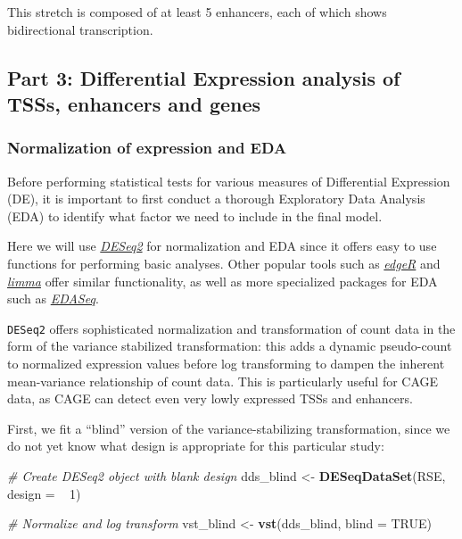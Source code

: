 \documentclass[9pt,a4paper,]{extarticle}
\newenvironment{Shaded}{\begin{snugshade}}{\end{snugshade}}
\newcommand{\KeywordTok}[1]{\textcolor[rgb]{0.13,0.29,0.53}{\textbf{{#1}}}}
\newcommand{\DataTypeTok}[1]{\textcolor[rgb]{0.13,0.29,0.53}{{#1}}}
\newcommand{\DecValTok}[1]{\textcolor[rgb]{0.00,0.00,0.81}{{#1}}}
\newcommand{\StringTok}[1]{\textcolor[rgb]{0.31,0.60,0.02}{{#1}}}
\newcommand{\CommentTok}[1]{\textcolor[rgb]{0.56,0.35,0.01}{\textit{{#1}}}}
\newcommand{\OtherTok}[1]{\textcolor[rgb]{0.56,0.35,0.01}{{#1}}}
\newcommand{\NormalTok}[1]{{#1}}
\begin{document}
This stretch is composed of at least 5 enhancers, each of which shows bidirectional transcription.

\subsection{Part 3: Differential Expression analysis of TSSs, enhancers and genes}\label{part-3-differential-expression-analysis-of-tsss-enhancers-and-genes}

\subsubsection{Normalization of expression and EDA}\label{normalization-of-expression-and-eda}

Before performing statistical tests for various measures of Differential Expression (DE), it is important to first conduct a thorough Exploratory Data Analysis (EDA) to identify what factor we need to include in the final model.

Here we will use \emph{\href{https://bioconductor.org/packages/3.8/DESeq2}{DESeq2}} \citep{Love2014} for normalization and EDA since it offers easy to use functions for performing basic analyses. Other popular tools such as \emph{\href{https://bioconductor.org/packages/3.8/edgeR}{edgeR}} \citep{Robinson2010} and \emph{\href{https://bioconductor.org/packages/3.8/limma}{limma}} \citep{Ritchie2015a} offer similar functionality, as well as more specialized packages for EDA such as \emph{\href{https://bioconductor.org/packages/3.8/EDASeq}{EDASeq}}.

\texttt{DESeq2} offers sophisticated normalization and transformation of count data in the form of the variance stabilized transformation: this adds a dynamic pseudo-count to normalized expression values before log transforming to dampen the inherent mean-variance relationship of count data. This is particularly useful for CAGE data, as CAGE can detect even very lowly expressed TSSs and enhancers.

First, we fit a ``blind'' version of the variance-stabilizing transformation, since we do not yet know what design is appropriate for this particular study:

\begin{Shaded}
\begin{Highlighting}[]
\CommentTok{# Create DESeq2 object with blank design}
\NormalTok{dds_blind <-}\StringTok{ }\KeywordTok{DESeqDataSet}\NormalTok{(RSE, }\DataTypeTok{design =} \NormalTok{~}\StringTok{ }\DecValTok{1}\NormalTok{)}

\CommentTok{# Normalize and log transform}
\NormalTok{vst_blind <-}\StringTok{ }\KeywordTok{vst}\NormalTok{(dds_blind, }\DataTypeTok{blind =} \OtherTok{TRUE}\NormalTok{)}
\end{Highlighting}
\end{Shaded}
\end{document}
